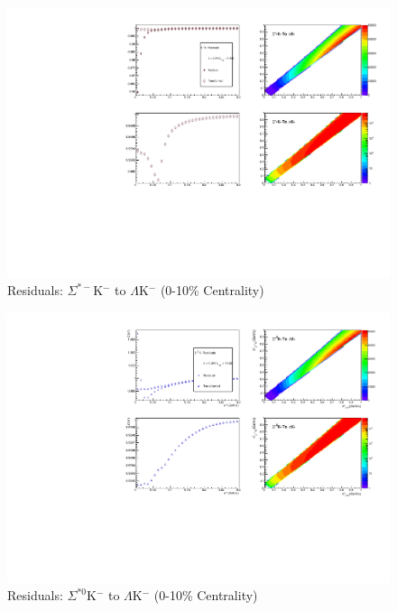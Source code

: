 \documentclass[../AnalysisNoteJBuxton.tex]{subfiles}
\begin{document}
\begin{figure}[h]
  \centering
  \includegraphics[width=\textwidth]{9_AdditionalFigures/Figures/Residuals/LamKchM/Residuals_LamKchM_0010_SigStMKchM_MomResCrctn_NonFlatBgdCrctn_ResidualsIncluded_UsingCoulombOnlyInterpCfs.pdf}
  \caption[Residuals: $\Sigma^{*-}$K$^{-}$ to $\Lambda$K$^{-}$ (0-10\% Centrality)]{Residuals: $\Sigma^{*-}$K$^{-}$ to $\Lambda$K$^{-}$ (0-10\% Centrality)}
  \label{fig:Res_LamKchM_0010_SigStMKchM}
\end{figure}

\begin{figure}[h]
  \centering
  \includegraphics[width=\textwidth]{9_AdditionalFigures/Figures/Residuals/LamKchM/Residuals_LamKchM_0010_SigSt0KchM_MomResCrctn_NonFlatBgdCrctn_ResidualsIncluded_UsingCoulombOnlyInterpCfs.pdf}
  \caption[Residuals: $\Sigma^{*0}$K$^{-}$ to $\Lambda$K$^{-}$ (0-10\% Centrality)]{Residuals: $\Sigma^{*0}$K$^{-}$ to $\Lambda$K$^{-}$ (0-10\% Centrality)}
  \label{fig:Res_LamKchM_0010_SigSt0KchM}
\end{figure}
\end{document}
